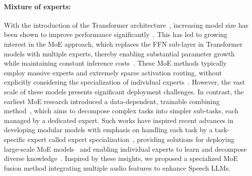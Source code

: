 \paragraph{Mixture of experts:} With the introduction of the Transformer architecture~\cite{NIPS2017_3f5ee243}, increasing model size has been shown to improve performance significantly~\cite{he2016deep,kaplan2020scaling}. This has led to growing interest in the MoE approach, which replaces the FFN sub-layer in Transformer models with multiple experts, thereby enabling substantial parameter growth while maintaining constant inference costs~\cite{shazeer2017outrageously}. These MoE methods typically employ massive experts and extremely sparse activation routing, without explicitly considering the specialization of individual experts~\cite{fedus2022switch, lepikhin2020gshard}. However, the vast scale of these models presents significant deployment challenges. In contrast, the earliest MoE research introduced a data-dependent, trainable combining method~\cite{jacobs1991adaptive, masoudnia2014mixture}, which aims to decompose complex tasks into simpler sub-tasks, each managed by a dedicated expert. Such works have inspired recent advances in developing modular models with emphasis on handling each task by a task-specific expert called expert specialization~\cite{ma2018modeling, gupta2022sparsely}, providing solutions for deploying large-scale MoE models~\cite{lu2024not} and enabling individual experts to learn and decompose diverse knowledge~\cite{dai2024deepseekmoe}. Inspired by these insights, we proposed a specialized MoE fusion method integrating multiple audio features to enhance Speech LLMs.

